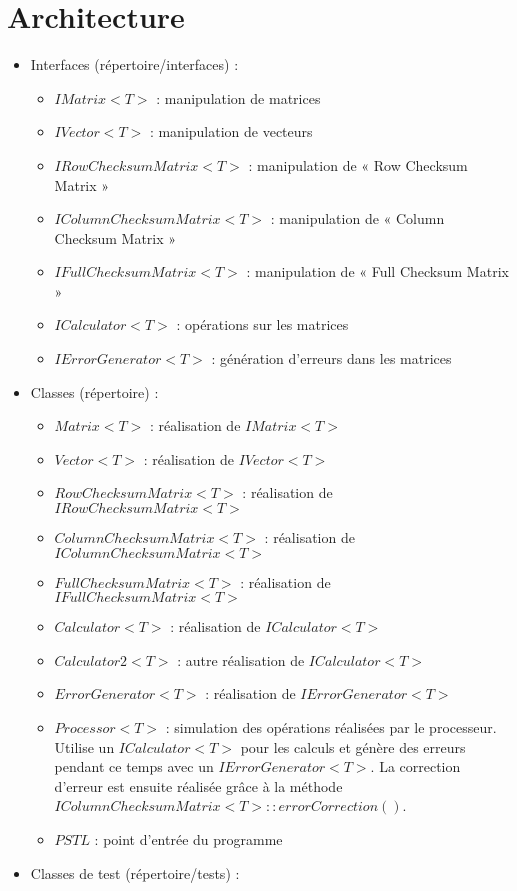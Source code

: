 \documentclass[a4paper,12pt]{report}
\begin{document}
\section{Architecture}
\begin{itemize}
  \item Interfaces (répertoire/interfaces) :
    \begin{itemize}
      \item $IMatrix<T>$ : manipulation de matrices
      \item $IVector<T>$ : manipulation de vecteurs
      \item $IRowChecksumMatrix<T>$ : manipulation de « Row Checksum Matrix »
      \item $IColumnChecksumMatrix<T>$ : manipulation de « Column Checksum Matrix »
      \item $IFullChecksumMatrix<T>$ : manipulation de « Full Checksum Matrix »
      \item $ICalculator<T>$ : opérations sur les matrices
      \item $IErrorGenerator<T>$ : génération d’erreurs dans les matrices
    \end{itemize}
  \item Classes (répertoire) :
    \begin{itemize}
      \item $Matrix<T>$ : réalisation de $IMatrix<T>$
      \item $Vector<T>$ : réalisation de $IVector<T>$
      \item $RowChecksumMatrix<T>$ : réalisation de $IRowChecksumMatrix<T>$
      \item $ColumnChecksumMatrix<T>$ : réalisation de $IColumnChecksumMatrix<T>$
      \item $FullChecksumMatrix<T>$ : réalisation de $IFullChecksumMatrix<T>$
      \item $Calculator<T>$ : réalisation de $ICalculator<T>$
      \item $Calculator2<T>$ : autre réalisation de $ICalculator<T>$
      \item $ErrorGenerator<T>$ : réalisation de $IErrorGenerator<T>$
      \item $Processor<T>$ : simulation des opérations réalisées par le processeur. Utilise
      un $ICalculator<T>$ pour les calculs et génère des erreurs pendant ce temps
      avec un $IErrorGenerator<T>$. La correction d’erreur est ensuite réalisée
      grâce à la méthode $IColumnChecksumMatrix<T>::errorCorrection()$.
      \item $PSTL$ : point d’entrée du programme


    \end{itemize}
  \item Classes de test (répertoire/tests) :
\end{itemize}
\end{document}

